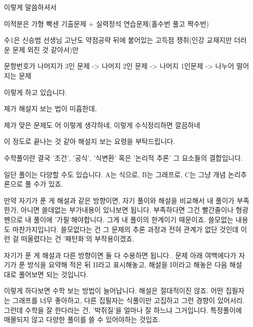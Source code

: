     이렇게 말씀하셔서
    \vspace{5mm}

    미적분은 가형 빡센 기출문제 + 실력정석 연습문제(홀수번 풀고 짝수번)
    \vspace{5mm}

    수1은  신승범 선생님 고난도 약점공략 뒤에 붙어있는 고득점 쟁취(인강 교재지만 더러운 문제 외진 것 같아서)만
    \vspace{5mm}

    문항번호가 나머지가 3인 문제 -> 나머지 2인 문제 -> 나머지 1인문제 -> 나누어 떨어지는 문제
    \vspace{5mm}

    이렇게 하고 있습니다.
    \vspace{5mm}

    제가 해설지 보는 법이 미흡한데,
    \vspace{5mm}

    제가 맞은 문제도 어 이렇게 생각하네, 이렇게 수식정리하면 깔끔하네
    \vspace{5mm}

    이 정도로 끝나는 것 같아 해설지 보는 요령을 부탁드립니다.
    \vspace{5mm}

    수학풀이란 결국 '조건', '공식', '식변환' 혹은 '논리적 추론'
    그 요소들의 결합입니다.
    \vspace{5mm}

일단 풀이는 다양할 수도 있습니다.
A는 식으로, B는 그래프로, C는 그냥 개념 논리추론으로 풀 수가 있죠.
\vspace{5mm}

만약 자기가 푼 게 해설과 같은 방향이면, 자기 풀이와 해설을 비교해서 내 풀이가 부족한가, 아니면 쓸데없는 부가내용이 있나보면 됩니다.
부족하다면 그건 빨간줄이나 형광펜으로 내 풀이에 '가필'해야합니다. 그게 내 풀이의 한계이기 때문이죠.
쓸모없는 내용도 마찬가지입니다. 쓸모없다는 건 그 문제의 추론 과정과 전혀 관계가 없단 것인데 이런 걸 떠올렸다는 건 '패턴화'의 부작용이겠죠.
\vspace{5mm}

자기가 푼 게 해설과 다른 방향이면 둘 다 수용하면 됩니다..
문제 아래 여백에다가 자기가 푼 방식을 요약해 적은 뒤 II라고 표시해놓고, 해설을 I이라고 해놓은 다음
해설 대로 풀어보면 되는 것입니다.
\vspace{5mm}

이렇게 하다보면 수학 보는 방법이 늘어납니다.
해설은 절대적이진 않죠. 어떤 집필자는 그래프를 너무 좋아하고, 다른 집필자는 식풀이만 고집하고 그런 경향이 있어서리.
그런데 수학을 잘 한다라는 건, '박쥐질'을 얼마나 잘 하느냐 그거입니다. 특정풀이에 매몰되지 않고 다양한 풀이를 쓸 수 있어야하는 것입죠.
\vspace{5mm}



